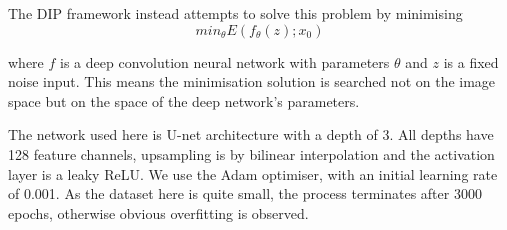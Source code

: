 \documentclass{article}
\begin{document}
The DIP framework instead attempts to solve this problem by minimising 
\begin{equation}
min_{\theta} E(f_{\theta}(z);x_0)
\label{eq:DIP}
\end{equation}

\noindent where $f$ is a deep convolution neural network with parameters $\theta$ and $z$ is a fixed noise input. This means the minimisation solution is searched not on the image space but on the space of the deep network's parameters.

The network used here is U-net architecture with a depth of 3. All depths have 128 feature channels, upsampling is by bilinear interpolation and the activation layer is a leaky ReLU. We use the Adam optimiser, with an initial learning rate of 0.001. As the dataset here is quite small, the process terminates after 3000 epochs, otherwise obvious overfitting is observed.




\end{document}
